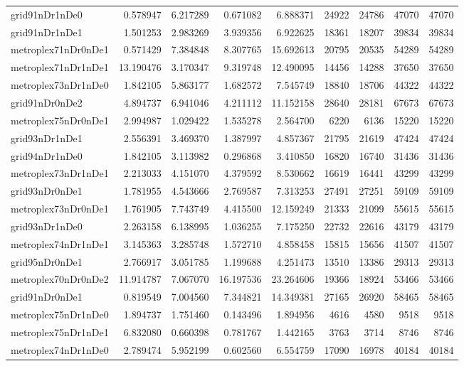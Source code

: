 \begin{longtable}{|l|r|r|r|r|r|r|r|r|}
grid91nDr1nDe0 & 0.578947 & 6.217289 & 0.671082 & 6.888371 & 24922 & 24786 & 47070 & 47070 \\
grid91nDr1nDe1 & 1.501253 & 2.983269 & 3.939356 & 6.922625 & 18361 & 18207 & 39834 & 39834 \\
metroplex71nDr0nDe1 & 0.571429 & 7.384848 & 8.307765 & 15.692613 & 20795 & 20535 & 54289 & 54289 \\
metroplex71nDr1nDe1 & 13.190476 & 3.170347 & 9.319748 & 12.490095 & 14456 & 14288 & 37650 & 37650 \\
metroplex73nDr1nDe0 & 1.842105 & 5.863177 & 1.682572 & 7.545749 & 18840 & 18706 & 44322 & 44322 \\
grid91nDr0nDe2 & 4.894737 & 6.941046 & 4.211112 & 11.152158 & 28640 & 28181 & 67673 & 67673 \\
metroplex75nDr0nDe1 & 2.994987 & 1.029422 & 1.535278 & 2.564700 & 6220 & 6136 & 15220 & 15220 \\
grid93nDr1nDe1 & 2.556391 & 3.469370 & 1.387997 & 4.857367 & 21795 & 21619 & 47424 & 47424 \\
grid94nDr1nDe0 & 1.842105 & 3.113982 & 0.296868 & 3.410850 & 16820 & 16740 & 31436 & 31436 \\
metroplex73nDr1nDe1 & 2.213033 & 4.151070 & 4.379592 & 8.530662 & 16619 & 16441 & 43299 & 43299 \\
grid93nDr0nDe1 & 1.781955 & 4.543666 & 2.769587 & 7.313253 & 27491 & 27251 & 59109 & 59109 \\
metroplex73nDr0nDe1 & 1.761905 & 7.743749 & 4.415500 & 12.159249 & 21333 & 21099 & 55615 & 55615 \\
grid93nDr1nDe0 & 2.263158 & 6.138995 & 1.036255 & 7.175250 & 22732 & 22616 & 43179 & 43179 \\
metroplex74nDr1nDe1 & 3.145363 & 3.285748 & 1.572710 & 4.858458 & 15815 & 15656 & 41507 & 41507 \\
grid95nDr0nDe1 & 2.766917 & 3.051785 & 1.199688 & 4.251473 & 13510 & 13386 & 29313 & 29313 \\
metroplex70nDr0nDe2 & 11.914787 & 7.067070 & 16.197536 & 23.264606 & 19366 & 18924 & 53466 & 53466 \\
grid91nDr0nDe1 & 0.819549 & 7.004560 & 7.344821 & 14.349381 & 27165 & 26920 & 58465 & 58465 \\
metroplex75nDr1nDe0 & 1.894737 & 1.751460 & 0.143496 & 1.894956 & 4616 & 4580 & 9518 & 9518 \\
metroplex75nDr1nDe1 & 6.832080 & 0.660398 & 0.781767 & 1.442165 & 3763 & 3714 & 8746 & 8746 \\
metroplex74nDr1nDe0 & 2.789474 & 5.952199 & 0.602560 & 6.554759 & 17090 & 16978 & 40184 & 40184 \\

\end{longtable}
